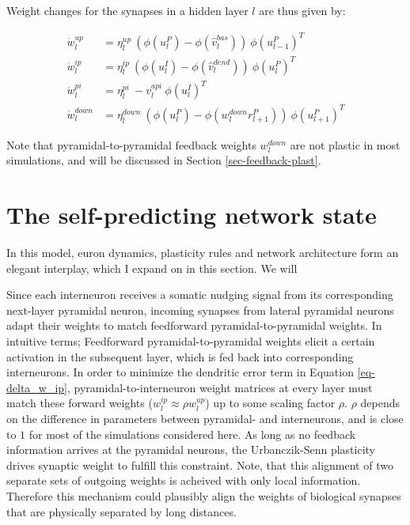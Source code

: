 Weight changes for the synapses in a hidden layer $l$ are thus given by:

\begin{align}
  \dot{w}_{l}^{up}   & = \eta_l^{up} \ ( \phi(u_l^{P}) - \phi(\hat{v}_l^{bas}) ) \ \phi(u_{l-1}^{P})^T\label{eq-delta_w_up}         \\
  \dot{w}_{l}^{ip}   & = \eta_l^{ip} \ ( \phi(u_l^{I}) - \phi(\hat{v}_l^{dend}) ) \ \phi(u_{l}^{P})^T\label{eq-delta_w_ip}          \\
  \dot{w}_{l}^{pi}   & = \eta_l^{pi} \ - v_l^{api} \ \phi(u_l^{I})^T\label{eq-delta_w_pi}                                           \\
  \dot{w}_{l}^{down} & = \eta_l^{down} \ ( \phi(u_l^{P}) - \phi(w_l^{down} r_{l+1}^P) )\ \phi(u_{l+1}^{P})^T\label{eq-delta_w_down}
\end{align}

Note that pyramidal-to-pyramidal feedback weights $w_l^{down}$ are not plastic in most simulations, and will be
discussed in Section \ref{sec-feedback-plast}.



\section{The self-predicting network state}

In this model, euron dynamics, plasticity rules and network architecture form an elegant interplay, which I expand on in
this section. We will

Since each interneuron receives a somatic nudging signal from its corresponding next-layer pyramidal neuron, incoming
synapses from lateral pyramidal neurons adapt their weights to match feedforward pyramidal-to-pyramidal weights. In
intuitive terms; Feedforward pyramidal-to-pyramidal weights elicit a certain activation in the subsequent layer, which
is fed back into corresponding interneurons. In order to minimize the dendritic error term in Equation
\ref{eq-delta_w_ip}, pyramidal-to-interneuron weight matrices at every layer must match these forward weights ($w_l^{ip}
  \approx \rho w_l^{up}$) up to some scaling factor $\rho$. $\rho$ depends on the difference in parameters between
pyramidal- and interneurons, and is close to $1$ for most of the simulations considered here. As long as no feedback
information arrives at the pyramidal neurons, the Urbanczik-Senn plasticity drives synaptic weight to fulfill this
constraint. Note, that this alignment of two separate sets of outgoing weights is acheived with only local information.
Therefore this mechanism could plausibly align the weights of biological synapses that are physically separated by long
distances. \newline

